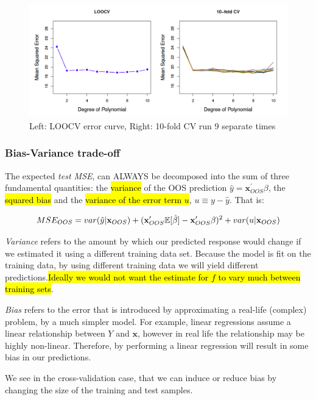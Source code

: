 \documentclass[11pt]{article}
\begin{document}
\begin{figure}[h]
    \centering
    \includegraphics[width = \textwidth]{pic/LOOCV vs kfold.png}
    \caption{Left: LOOCV error curve, Right: 10-fold CV run 9 separate times}
    \label{fig:LOOCV}
\end{figure}

\subsubsection{Bias-Variance trade-off} \label{sec:BV}

The expected \textit{test MSE}, can ALWAYS be decomposed into the sum of three fundamental quantities: the \hl{variance} of the OOS prediction $\hat{y} = \mathbf{x}_{OOS}^\prime\beta$, the \hl{squared bias} and the \hl{variance of the error term $u$}, $u \equiv y - \hat{y}$. That is:

\begin{equation}
\label{expected test mse}
    MSE_{OOS} = var(\hat{y}|\mathbf{x}_{OOS}) + (\mathbf{x}_{OOS}^\prime \mathbb{E}[\hat{\beta}] - \mathbf{x}_{OOS}^\prime\beta)^2 + var(u|\mathbf{x}_{OOS})
\end{equation}

\begin{mdframed}
    \textit{Variance} refers to the amount by which our predicted response would change if we estimated it using a different training data set. Because the model is fit on the training data, by using different training data we will yield different predictions.\hl{Ideally we would not want the estimate for $f$ to vary much between training sets}.

    \textit{Bias} refers to the error that is introduced by approximating a real-life (complex) problem, by a much simpler model. For example, linear regressions assume a linear relationship between $Y$ and $\mathbf{x}$, however in real life the relationship may be highly non-linear. Therefore, by performing a linear regression will result in some bias in our predictions.

    We see in the cross-validation case, that we can induce or reduce bias by changing the size of the training and test samples.
\end{mdframed}
\end{document}
